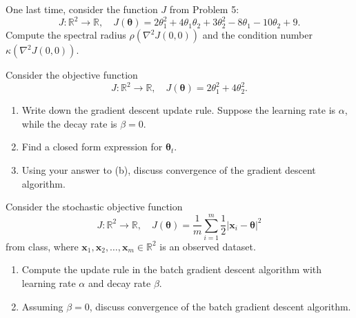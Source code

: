 \documentclass[12pt,reqno]{amsart}
\begin{document}
\vfill
\newpage
\prob One last time, consider the function $J$ from Problem 5:
	\[J: \mathbb{R}^2 \to \mathbb{R}, \quad J(\boldsymbol{\theta}) = 2\theta_1^2 + 4\theta_1\theta_2 + 3\theta_2^2 -8\theta_1 - 10\theta_2 + 9.
	\]
Compute the spectral radius $\rho\left(\nabla^2J(0,0)\right)$ and the condition number $\kappa\left(\nabla^2 J(0,0)\right)$.









\vfill
\prob Consider the objective function
	\[J:\mathbb{R}^2 \to \mathbb{R}, \quad J(\boldsymbol{\theta}) = 2\theta_1^2 + 4\theta_2^2.
	\]


\begin{enumerate}
\item Write down the gradient descent update rule. Suppose the learning rate is $\alpha$, while the decay rate is $\beta=0$.\vfill
\item Find a closed form expression for $\boldsymbol{\theta}_t$.\vfill
\item Using your answer to (b), discuss convergence of the gradient descent algorithm.
\end{enumerate}









\vfill
\newpage
\prob Consider the stochastic objective function
	\[J:\mathbb{R}^2 \to \mathbb{R}, \quad J(\boldsymbol{\theta}) = \frac{1}{m} \sum_{i=1}^m \frac{1}{2}|\mathbf{x}_i - \boldsymbol{\theta}|^2
	\]
from class, where $\mathbf{x}_1,\mathbf{x}_2, \ldots, \mathbf{x}_m \in \mathbb{R}^2$ is an observed dataset.

\medskip
\begin{enumerate}
\item Compute the update rule in the batch gradient descent algorithm with learning rate $\alpha$ and decay rate $\beta$.\vfill
\item Assuming $\beta=0$, discuss convergence of the batch gradient descent algorithm.\vfill
\end{enumerate}
\end{document}
